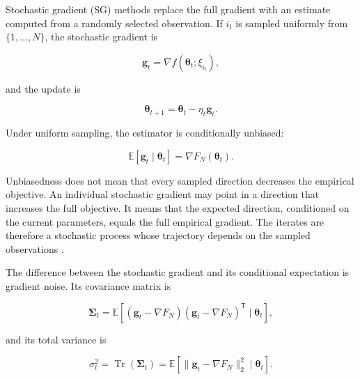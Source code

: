 Stochastic gradient (SG) methods replace the full gradient with an estimate
computed from a randomly selected observation. If $i_t$ is sampled uniformly
from $\{1,\ldots,N\}$, the stochastic gradient is

\begin{equation}
    \mathbf{g}_t
    =
    \nabla f(\boldsymbol{\theta}_t;\xi_{i_t}),
    \label{eq:opt-stochastic-gradient}
\end{equation}

and the update is

\begin{equation}
    \boxed{
    \boldsymbol{\theta}_{t+1}
    =
    \boldsymbol{\theta}_t-\eta_t\mathbf{g}_t.
    }
    \label{eq:opt-sgd-update}
\end{equation}

Under uniform sampling, the estimator is conditionally unbiased:

\begin{equation}
    \mathbb{E}
    [\mathbf{g}_t\mid\boldsymbol{\theta}_t]
    =
    \nabla F_N(\boldsymbol{\theta}_t).
    \label{eq:opt-unbiased-gradient}
\end{equation}

Unbiasedness does not mean that every sampled direction decreases the
empirical objective. An individual stochastic gradient may point in a
direction that increases the full objective. It means that the expected
direction, conditioned on the current parameters, equals the full
empirical gradient. The iterates are therefore a stochastic process whose
trajectory depends on the sampled observations
\parencite{Bottou2018Optimization}.

The difference between the stochastic gradient and its conditional
expectation is gradient noise. Its covariance matrix is

\begin{equation}
    \boldsymbol{\Sigma}_t
    =
    \mathbb{E}\left[
       (\mathbf{g}_t-\nabla F_N)
       (\mathbf{g}_t-\nabla F_N)^{\mathsf{T}}
       \mid\boldsymbol{\theta}_t
    \right],
    \label{eq:opt-gradient-covariance}
\end{equation}

and its total variance is

\begin{equation}
    \sigma_t^2
    =
    \operatorname{Tr}(\boldsymbol{\Sigma}_t)
    =
    \mathbb{E}\left[
       \|\mathbf{g}_t-\nabla F_N\|_2^2
       \mid\boldsymbol{\theta}_t
    \right].
    \label{eq:opt-gradient-variance}
\end{equation}

